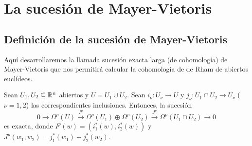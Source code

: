 \documentclass[CV.tex]{subfiles}
\begin{document}

\chapter{La sucesión de Mayer-Vietoris}

\section{Definición de la sucesión de Mayer-Vietoris}
Aquí desarrollaremos la llamada sucesión exacta larga (de cohomología) de Mayer-Vietoris que nos permitirá calcular la cohomología de de Rham de abiertos euclídeos.

\begin{teorema}\label{5.1}
Sean $U_1,U_2\subseteq\mathbb{R}^n$ abiertos y $U=U_1\cup U_2$. Sean $i_{\nu}:U_{\nu}\to U$ y $j_{\nu}:U_1\cap U_2\to U_{\nu}$ ($\nu=1,2$) las correspondientes inclusiones. Entonces, la sucesión
\[
0\to \Omega^p(U)\overset{I^p}{\to}\Omega^p(U_1)\oplus\Omega^p(U_2)\overset{J^p}{\to}\Omega^p(U_1\cap U_2)\to 0
\]
es exacta, donde $I^p(w)=(i_1^*(w), i_2^*(w))$ y $J^p(w_1,w_2)=j_1^*(w_1)-j_2^*(w_2)$.
\end{teorema}
\end{document}
